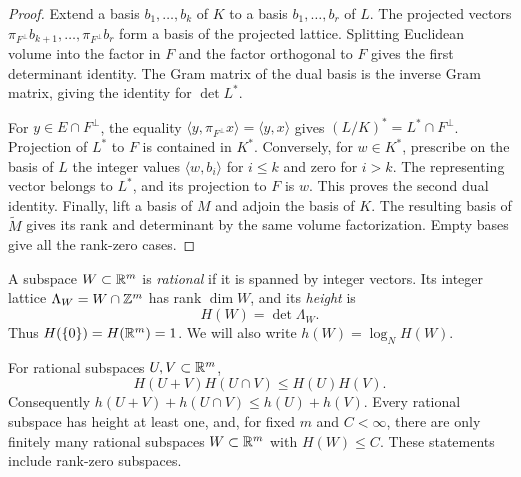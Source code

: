 \begin{proof}
Extend a basis \(b_1,\ldots,b_k\) of \(K\) to a basis
\(b_1,\ldots,b_r\) of \(L\). The projected vectors
\(\pi_{F^\perp}b_{k+1},\ldots,\pi_{F^\perp}b_r\) form a basis of the
projected lattice. Splitting Euclidean volume into the factor in \(F\)
and the factor orthogonal to \(F\) gives the first determinant identity.
The Gram matrix of the dual basis is the inverse Gram matrix, giving
the identity for \(\det L^*\).

For \(y\in E\cap F^\perp\), the equality
\(\langle y,\pi_{F^\perp}x\rangle=\langle y,x\rangle\) gives
\((L/K)^*=L^*\cap F^\perp\). Projection of \(L^*\) to \(F\) is
contained in \(K^*\). Conversely, for \(w\in K^*\), prescribe on the
basis of \(L\) the integer values \(\langle w,b_i\rangle\) for
\(i\le k\) and zero for \(i>k\). The representing vector belongs to
\(L^*\), and its projection to \(F\) is \(w\). This proves the second
dual identity. Finally, lift a basis of \(M\) and adjoin the basis of
\(K\). The resulting basis of \(\widetilde M\) gives its rank and
determinant by the same volume factorization. Empty bases give all the
rank-zero cases.
\end{proof}

A subspace \(W\subset\mathbb R^m\) is \emph{rational} if it is spanned by
integer vectors. Its integer lattice \(\Lambda_W=W\cap\mathbb Z^m\) has
rank \(\dim W\), and its \emph{height} is
\[
 H(W)=\det\Lambda_W.
\]
Thus \(H(\{0\})=H(\mathbb R^m)=1\). We will also write
\(h(W)=\log_N H(W)\).

\begin{lemma}\label{lem:height-submodularity}
For rational subspaces \(U,V\subset\mathbb R^m\),
\[
 H(U+V)H(U\cap V)\le H(U)H(V).
\]
Consequently \(h(U+V)+h(U\cap V)\le h(U)+h(V)\).
Every rational subspace has height at least one, and, for fixed \(m\)
and \(C<\infty\), there are only finitely many rational subspaces
\(W\subset\mathbb R^m\) with \(H(W)\le C\). These statements include
rank-zero subspaces.
\end{lemma}

